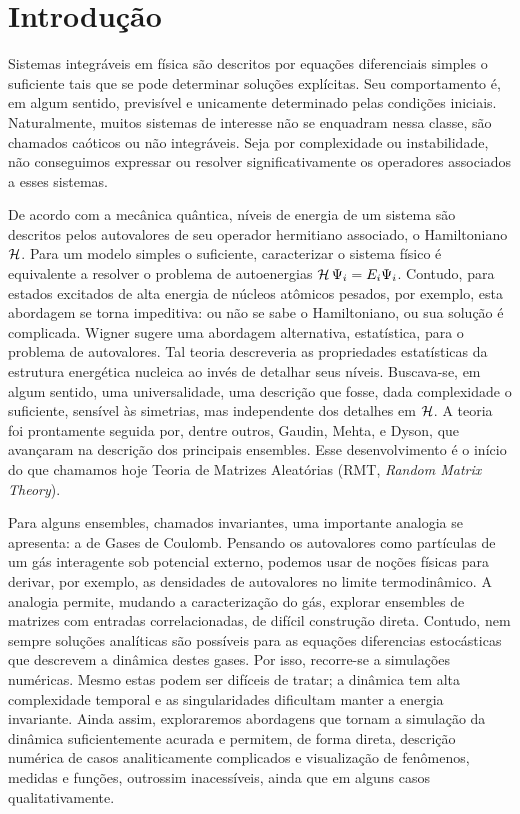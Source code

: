 \chapter{Introdução}
\label{Capitulo: Intro}

Sistemas integráveis em física são descritos por equações diferenciais simples o suficiente tais que se pode determinar soluções explícitas. Seu comportamento é, em algum sentido, previsível e unicamente determinado pelas condições iniciais. Naturalmente, muitos sistemas de interesse não se enquadram nessa classe, são chamados caóticos ou não integráveis. Seja por complexidade ou instabilidade, não conseguimos expressar ou resolver significativamente os operadores associados a esses sistemas. 

De acordo com a mecânica quântica, níveis de energia de um sistema são descritos pelos autovalores de seu operador hermitiano associado, o Hamiltoniano $\operatorname{\mathcal{H}}$. Para um modelo simples o suficiente, caracterizar o sistema físico é equivalente a resolver o problema de autoenergias $\operatorname{\mathcal{H}} \Psi_i = E_i \Psi_i$. Contudo, para estados excitados de alta energia de núcleos atômicos pesados, por exemplo, esta abordagem se torna impeditiva: ou não se sabe o Hamiltoniano, ou sua solução é complicada. Wigner sugere uma abordagem alternativa, estatística, para o problema de autovalores. Tal teoria descreveria as propriedades estatísticas da estrutura energética nucleica ao invés de detalhar seus níveis. Buscava-se, em algum sentido, uma universalidade, uma descrição que fosse, dada complexidade o suficiente, sensível às simetrias, mas independente dos detalhes em $\operatorname{\mathcal{H}}$. A teoria foi prontamente seguida por, dentre outros, Gaudin, Mehta, \cite{MehtaGaudin} e Dyson, \cite{Dyson} que avançaram na descrição dos principais ensembles. Esse desenvolvimento é o início do que chamamos hoje Teoria de Matrizes Aleatórias (RMT, \textit{Random Matrix Theory}).

Para alguns ensembles, chamados invariantes, uma importante analogia se apresenta: a de Gases de Coulomb. Pensando os autovalores como partículas de um gás interagente sob potencial externo, podemos usar de noções físicas para derivar, por exemplo, as densidades de autovalores no limite termodinâmico. A analogia permite, mudando a caracterização do gás, explorar ensembles de matrizes com entradas correlacionadas, de difícil construção direta. Contudo, nem sempre soluções analíticas são possíveis para as equações diferencias estocásticas que descrevem a dinâmica destes gases. Por isso, recorre-se a simulações numéricas. Mesmo estas podem ser difíceis de tratar; a dinâmica tem alta complexidade temporal e as singularidades dificultam manter a energia invariante. Ainda assim, exploraremos abordagens que tornam a simulação da dinâmica suficientemente acurada e permitem, de forma direta, descrição numérica de casos analiticamente complicados e visualização de fenômenos, medidas e funções, outrossim inacessíveis, ainda que em alguns casos qualitativamente.



